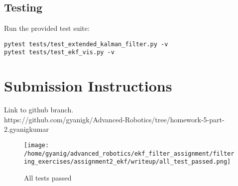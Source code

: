\documentclass[11pt]{article}
\begin{document}
\subsection{Testing}
Run the provided test suite:
\begin{verbatim}
pytest tests/test_extended_kalman_filter.py -v
pytest tests/test_ekf_vis.py -v
\end{verbatim}

\section{Submission Instructions}
Link to github branch.\\
https://github.com/gyanigk/Advanced-Robotics/tree/homework-5-part-2.gyanigkumar

\begin{figure}[H]
    \centering
    \begin{minipage}[t]{1.0\textwidth}
        \centering
        \texttt{[image: /home/gyanig/advanced\_robotics/ekf\_filter\_assignment/filtering\_exercises/assignment2\_ekf/writeup/all\_test\_passed.png]}
        \caption{All tests passed}
        \label{fig:gridworld_v0_det_vi}
    \end{minipage}
\end{figure}
\end{document}
